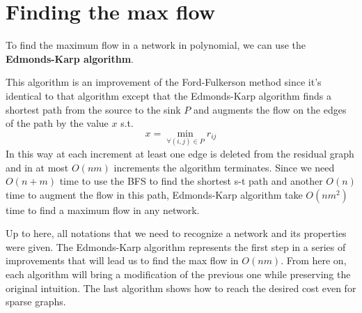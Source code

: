 \section{Finding the max flow}
To find the maximum flow in a network in polynomial, we can use the \textbf{Edmonds-Karp algorithm}\cite{Edmonds_Karp}.

This algorithm is an improvement of the Ford-Fulkerson\cite{FordFulkerson} method since it's identical to that algorithm except that the Edmonds-Karp algorithm finds a shortest path from the source to the sink $P$ and augments the flow on the edges of the path by the value $x$ s.t.
\[x = \min_{\forall (i,j)\in P} r_{ij}\]
In this way at each increment at least one edge is deleted from the residual graph and in at most $O(nm)$ increments the algorithm terminates.
Since we need $O(n+m)$ time to use the BFS to find the shortest s-t path and another $O(n)$ time to augment the flow in this path, Edmonds-Karp algorithm take $O(nm^2)$ time to find a maximum flow in any network.

Up to here, all notations that we need to recognize a network and its properties were given. The Edmonds-Karp algorithm represents the first step in a series of improvements that will lead us to find the max flow in $O(nm)$. From here on, each algorithm will bring a modification of the previous one while preserving the original intuition. The last algorithm shows how to reach the desired cost even for sparse graphs.

\cleardoublepage
